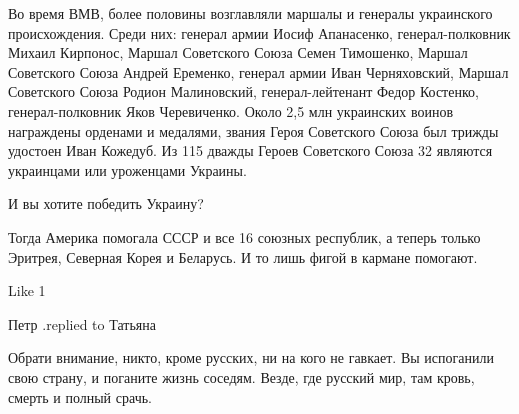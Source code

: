 Во время ВМВ, более половины возглавляли маршалы и генералы украинского
происхождения. Среди них: генерал армии Иосиф Апанасенко, генерал-полковник
Михаил Кирпонос, Маршал Советского Союза Семен Тимошенко, Маршал Советского
Союза Андрей Еременко, генерал армии Иван Черняховский, Маршал Советского Союза
Родион Малиновский, генерал-лейтенант Федор Костенко, генерал-полковник Яков
Черевиченко. Около 2,5 млн украинских воинов награждены орденами и медалями,
звания Героя Советского Союза был трижды удостоен Иван Кожедуб. Из 115 дважды
Героев Советского Союза 32 являются украинцами или уроженцами Украины.

И вы хотите победить Украину?

Тогда Америка помогала СССР и все 16 союзных республик, а теперь только
Эритрея, Северная Корея и Беларусь. И то лишь фигой в кармане помогают.

    Like 1

Петр .replied to Татьяна

Обрати внимание, никто, кроме  русских, ни на кого не гавкает. Вы испоганили
свою страну, и поганите жизнь соседям. Везде, где русский мир, там кровь,
смерть и полный срачь.

